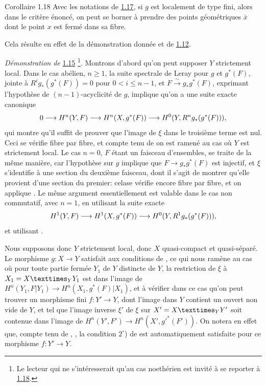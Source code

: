 \documentclass[10pt]{../fichiers-configuration-latex/smfart}
\begin{document}
\begin{enonce*}{Corollaire 1.18}
Avec les notations de \hyperref[XV.cor1.17]{1.17}, si $g$ est localement de type fini,
alors dans le critère énoncé, on peut se borner à prendre des points
géométriques $\bar{x}$ dont le point $x$ est fermé dans sa fibre.
\end{enonce*}

Cela résulte en effet de la démonstration donnée et de \hyperref[XV.cor1.12]{1.12}.

\noindent
\emph{Démonstration de} \hyperref[XV.thm1.15]{1.15} \footnote[1]{Le lecteur qui ne
s'intéresserait qu'au cas noethérien est invité à se reporter à
\hyperref[XV.rem1.18]{1.18}.}.
Montrons d'abord qu'on peut supposer $Y$ strictement
local. Dans le cas abélien, $n\geq 1$, la suite spectrale de Leray
pour $g$ et $g^{\ast}(F)$, jointe à $R^{i}g_{\ast}(g^{\ast}(F))=0$
pour $0<i\leq n-1$, et $F\xrightarrow{\sim}g_{\ast}g^{\ast}(F)$,
exprimant l'hypothèse de $(n-1)$-acyclicité de $g$, implique qu'on a
une suite exacte canonique
$$
0\longrightarrow H^{n}(Y,F)\longrightarrow
H^{n}(X,g^{\ast}(F))\longrightarrow
H^{0}(Y,R^{n}g_{\ast}(g^{\ast}(F))){},
$$
qui montre qu'il suffit de prouver que l'image de $\xi$ dans le
troisième terme est nul. Ceci se vérifie fibre par fibre, et compte
tenu de  on est ramené au cas où $Y$ est strictement local.
Le cas $n=0$, $F$ étant un faisceau d'ensembles, se traite de la même
manière, car l'hypothèse sur $g$ implique que $F\rightarrow
g_{\ast}g^{\ast}(F)$ est injectif, et $\xi$ s'identifie à une section
du deuxième faisceau, dont il s'agit de montrer qu'elle provient d'une
section du premier: cela\pageoriginale se vérifie encore fibre par
fibre, et on applique .
Le même argument essentiellement est
valable dans le cas non commutatif, avec $n=1$, en utilisant la suite
exacte 
$$
H^{1}(Y,F)\longrightarrow H^{1}(X,g^{\ast}(F))\longrightarrow
H^{0}(Y,R^{1}g_{\ast}(g^{\ast}(F))){},
$$
et utilisant .

Nous supposons donc $Y$ strictement local, donc $X$ quasi-compact et
quasi-séparé. Le morphisme $g:X\rightarrow Y$ satisfait aux conditions
de , ce qui nous ramène au cas où pour toute partie fermée
$Y_{1}$ de $Y$ distincte de $Y$, la restriction de $\xi$ à
$X_{1}=\fprod{X}{Y_1}{Y}$ est dans l'image de
$H^{n}(Y_1,F|Y_1)\rightarrow H^{n}(X_1,g^{\ast}(F)|X_1)$, et à
vérifier dans ce cas qu'on peut trouver un morphisme fini $f:Y' \rightarrow Y$,
dont l'image dans $Y$ contient un ouvert non vide de $Y$, et tel que
l'image inverse $\xi'$ de $\xi$ sur $X'=\fprod{X}{Y'}{Y}$ soit
contenue dans l'image de $H^{n}(Y',F')\rightarrow
H^{n}(X',{g'}^{\ast}(F'))$. On notera en effet que, compte tenu de
, , la condition $2^{\circ}$) de \loccit est
automatiquement satisfaite pour ce morphisme $f:Y'\rightarrow Y$.
\end{document}
